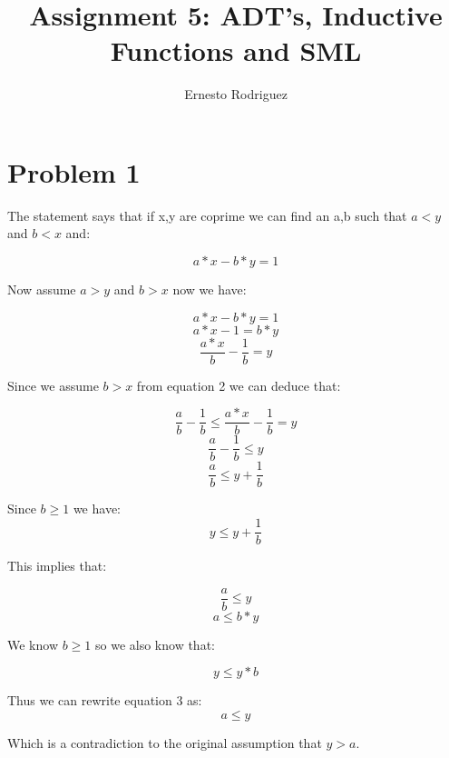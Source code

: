 \documentclass{article}
\title{Assignment 5: ADT's, Inductive Functions and SML}
\author{Ernesto Rodriguez}
\begin{document}
\maketitle

\section{Problem 1}

The statement says that if x,y are coprime we can find an a,b such that $a<y$ and $b<x$ and:

\begin{equation}
  a*x-b*y=1
\end{equation}

Now assume $a>y$ and $b>x$ now we have:

\[
a*x-b*y=1 
\]
\[
a*x-1=b*y
\]
\begin{equation}
\frac{a*x}{b}-\frac{1}{b}=y
\end{equation}

Since we assume $b>x$ from equation 2 we can deduce that:

\[
\frac{a}{b}-\frac{1}{b}\leq\frac{a*x}{b}-\frac{1}{b}=y
\]
\[
\frac{a}{b}-\frac{1}{b}\leq y
\]
\[
\frac{a}{b}\leq y+\frac{1}{b}
\]

Since $b\geq1$ we have:
\[
y \leq y+\frac{1}{b}
\]

This implies that:

\[
\frac{a}{b}\leq y
\]
\begin{equation}
  a\leq b*y
\end{equation}

We know $b\geq1$ so we also know that:

\[
y\leq y*b
\]

Thus we can rewrite equation 3 as:
\begin{equation}
  a \leq y
\end{equation}

Which is a contradiction to the original assumption that $y>a$.
\end{document}
